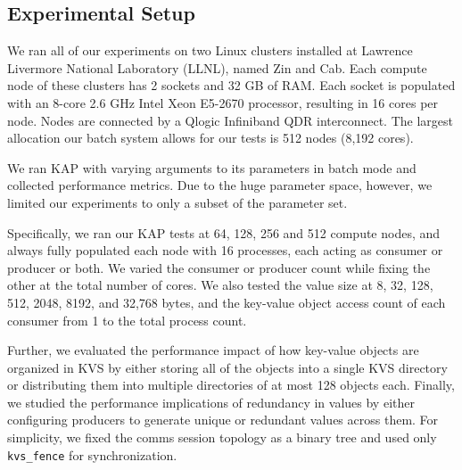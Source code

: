\subsection{Experimental Setup}
We ran all of our experiments on two Linux clusters installed at 
Lawrence Livermore National Laboratory (LLNL),
named Zin and Cab.
Each compute node of these clusters has 2 sockets and 32 GB of RAM.
Each socket is populated with an 8-core 2.6 GHz Intel
Xeon E5-2670 processor, resulting in 16 cores per node.
Nodes are connected by a Qlogic Infiniband QDR interconnect.
The largest allocation our batch system allows for our tests is
512 nodes (8,192 cores).

We ran KAP with varying arguments to its parameters
in batch mode and collected 
performance metrics. 
Due to the huge parameter space, however, we limited our experiments to
only a subset of the parameter set.

Specifically, we ran our KAP tests at 64, 128, 256 and 512
compute nodes, and always fully populated each node with
16 processes, each acting as consumer or producer or
both. We varied the consumer or producer count
while fixing the other at the total number of cores.
We also tested the value size at
8, 32, 128, 512, 2048, 8192, and 32,768 bytes,
and the key-value object access count of each consumer
from 1 to the total process count.

Further, we evaluated the performance impact 
of how key-value objects are organized 
in KVS by either storing all of the objects into a single KVS directory
or distributing them into multiple directories of at most 128 objects each.
Finally, we studied the performance implications of 
redundancy in values by either configuring producers to generate
unique or redundant values across them.
For simplicity, we fixed the comms session topology as a binary tree
and used only {\tt kvs\_fence} for synchronization.
